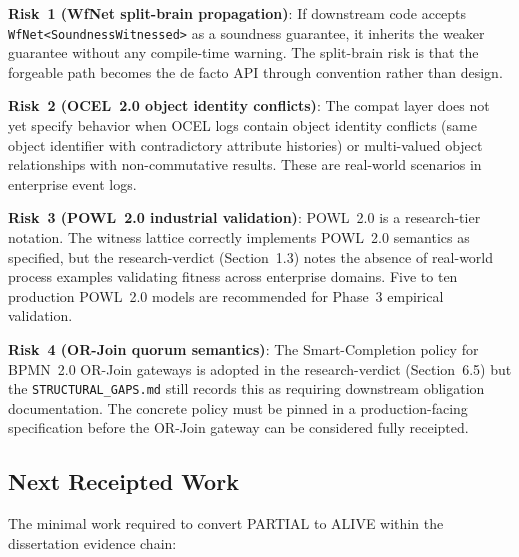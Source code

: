 \textbf{Risk~1 (WfNet split-brain propagation)}: If downstream code accepts
\texttt{WfNet<SoundnessWitnessed>} as a soundness guarantee, it inherits the weaker
guarantee without any compile-time warning. The split-brain risk is that the forgeable
path becomes the de facto API through convention rather than design.

\textbf{Risk~2 (OCEL~2.0 object identity conflicts)}: The compat layer does not yet
specify behavior when OCEL logs contain object identity conflicts (same object identifier
with contradictory attribute histories) or multi-valued object relationships with
non-commutative results. These are real-world scenarios in enterprise event logs.

\textbf{Risk~3 (POWL~2.0 industrial validation)}: POWL~2.0 is a research-tier notation.
The witness lattice correctly implements POWL~2.0 semantics as specified, but the
research-verdict (Section~1.3) notes the absence of real-world process examples validating
fitness across enterprise domains. Five to ten production POWL~2.0 models are recommended
for Phase~3 empirical validation.

\textbf{Risk~4 (OR-Join quorum semantics)}: The Smart-Completion policy for BPMN~2.0
OR-Join gateways is adopted in the research-verdict (Section~6.5) but the
\texttt{STRUCTURAL\_GAPS.md} still records this as requiring downstream obligation
documentation. The concrete policy must be pinned in a production-facing specification
before the OR-Join gateway can be considered fully receipted.

\subsection{Next Receipted Work}
\label{sec:sources-wasm4pm-compat-openquestions-next}

The minimal work required to convert PARTIAL to ALIVE within the dissertation evidence
chain:

